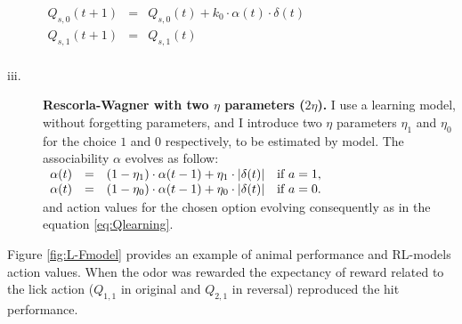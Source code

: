 \begin{description}
    $\begin{array}{lcl}
       Q_{s,0}(t+1)&=&Q_{s,0}(t)+k_0\cdot\alpha(t)\cdot\delta(t)\\
         Q_{s,1}(t+1)&=&Q_{s,1}(t)\\ 
    \end{array}$
    \item[iii.] \textbf{Rescorla-Wagner with two $\eta$ parameters ($2\eta$).} I use a learning model, without forgetting parameters, and I introduce two $\eta$ parameters $\eta_1$ and $\eta_0$ for the choice $1$ and $0$ respectively, to be estimated by model. The associability $\alpha$ evolves as follow:\\
   $\begin{array}{lcll}
    \alpha(t) & = & (1-\eta_1)\cdot\alpha(t-1)+\eta_1\cdot\left\lvert\delta(t)\right\rvert & \mbox{if\,\,}  a=1,\\
    \alpha(t) & = & (1-\eta_0)\cdot\alpha(t-1)+\eta_0\cdot\left\lvert\delta(t)\right\rvert & \mbox{if\,\,}  a=0.\\
    \end{array}$\\
    and action values for the chosen option evolving consequently as in the equation \ref{eq:Qlearning}.
\end{description}
Figure \ref{fig:L-Fmodel} provides an example of animal performance and RL-models action values. When the odor was rewarded the expectancy of reward related to the lick action ($Q_{1,1}$ in original and $Q_{2,1}$ in reversal) reproduced the hit performance. 
